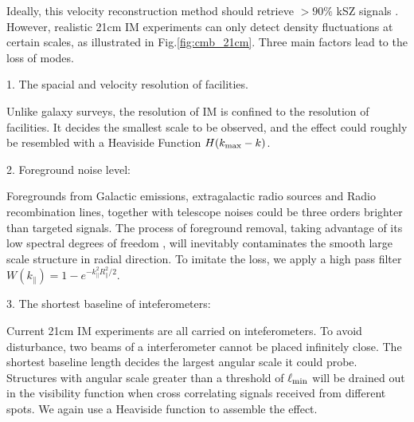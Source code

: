 Ideally, this velocity reconstruction method should 
retrieve $>90\%$ kSZ signals \cite{Shao11}. 
However, realistic 21cm IM experiments 
can only detect density fluctuations at certain scales, 
as illustrated in Fig.\ref{fig:cmb_21cm}. 
Three main factors lead to the loss of modes. 

1. The spacial and velocity resolution of facilities. 

Unlike galaxy surveys, the resolution of IM is confined to 
the resolution of facilities. 
It decides the smallest scale to be observed, 
and the effect could roughly be resembled with a Heaviside Function 
$H(k_\mathrm{max}-k)$. 

2. Foreground noise level:

Foregrounds from Galactic emissions, 
extragalactic radio sources and Radio recombination lines, 
together with telescope noises 
could be three orders brighter than targeted signals\cite{DiMatteo04,Masui13}. 
The process of foreground removal, taking advantage of its low spectral
degrees of freedom \cite{Switzer15}, 
will inevitably contaminates the smooth large scale structure in radial direction.  
To imitate the loss, we apply a high pass filter $W(k_\parallel)=1-e^{-k_\parallel^2R_\parallel^2/2}$. 

3. The shortest baseline of inteferometers:

Current 21cm IM experiments are all carried on inteferometers. 
To avoid disturbance, two beams of a interferometer 
cannot be placed infinitely close. 
The shortest baseline length decides the largest 
angular scale it could probe.  
Structures with angular scale greater than a threshold of 
$\ell_\mathrm{min}$ will be drained out 
in the visibility function 
when cross correlating signals received from different spots. 
We again use a Heaviside function to assemble the effect. 


